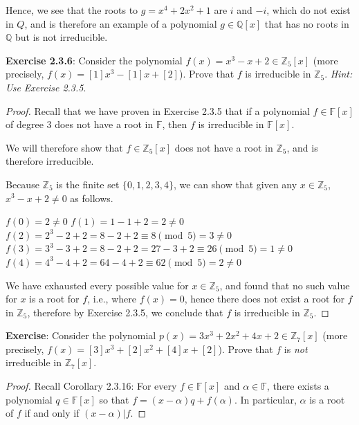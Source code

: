 \documentclass[a4paper]{article}
\begin{document}
\begin{myparindent}{0pt}
Hence, we see that the roots to $g = x^4 + 2x^2 + 1$ are $i$ and $-i$, which
do not exist in $Q$, and is therefore an example of a polynomial
$g \in \mathbb{Q}[x]$ that has no roots in $\mathbb{Q}$ but is not irreducible.
\newline

\textbf{Exercise 2.3.6}:
Consider the polynomial $f(x) = x^3 - x + 2 \in \mathbb{Z}_5[x]$ (more precisely,
$f(x) = [1]x^3 - [1]x + [2]$). Prove that $f$ is irreducible in $\mathbb{Z}_5$.
\textit{Hint: Use Exercise 2.3.5}.
\newline
\begin{proof}
  Recall that we have proven in Exercise 2.3.5 that if a polynomial
  $f \in \mathbb{F}[x]$ of degree 3 does not have a root in $\mathbb{F}$, then
  $f$ is irreducible in $\mathbb{F}[x]$. \newline

  We will therefore show that $f \in \mathbb{Z}_5[x]$ does not have a root in
  $\mathbb{Z}_5$, and is therefore irreducible. \newline

  Because $\mathbb{Z}_5$ is the finite set $\{0, 1, 2, 3, 4\}$, we can show
  that given any $x \in \mathbb{Z}_5$, $x^3 - x + 2 \neq 0$ as follows.
  \newline

  $f(0) = 2 \neq 0$ \newline
  $f(1) = 1 - 1 + 2 = 2 \neq 0$ \newline
  $f(2) = 2^3 - 2 + 2 = 8 - 2 + 2 \equiv 8 \pmod{5} = 3 \neq 0$ \newline
  $f(3) = 3^3 - 3 + 2 = 8 - 2 + 2 = 27 - 3 + 2 \equiv 26 \pmod{5} = 1 \neq 0$ \newline
  $f(4) = 4^3 - 4 + 2 = 64 - 4 + 2 \equiv 62 \pmod{5} = 2 \neq 0$ \newline

  We have exhausted every possible value for $x \in \mathbb{Z}_5$, and found
  that no such value for $x$ is a root for $f$, i.e., where $f(x) = 0$, hence
  there does not exist a root for $f$ in $\mathbb{Z}_5$, therefore by Exercise
  2.3.5, we conclude that $f$ is irreducible in $\mathbb{Z}_5$.
\end{proof}

\textbf{Exercise}:
Consider the polynomial $p(x) = 3x^3 + 2x^2 + 4x + 2 \in \mathbb{Z}_7[x]$
(more precisely, $f(x) = [3]x^3 + [2]x^2 + [4]x + [2]$). Prove that $f$ is
\textit{not} irreducible in $\mathbb{Z}_7[x]$.


\begin{proof}
  Recall Corollary 2.3.16: For every $f \in \mathbb{F}[x]$ and
  $\alpha \in \mathbb{F}$, there exists a polynomial $q \in \mathbb{F}[x]$
  so that $f = (x - \alpha)q + f(\alpha)$. In particular, $\alpha$ is a root
  of $f$ if and only if $(x - \alpha) | f$. \newline


\end{proof}
\end{myparindent}
\end{document}
